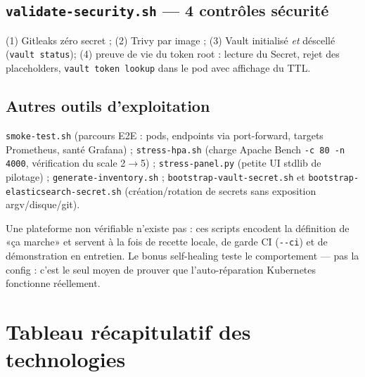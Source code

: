 \documentclass[11pt,a4paper]{article}
\begin{document}
\subsection{\texttt{validate-security.sh} --- 4 contrôles sécurité}
(1) Gitleaks zéro secret ; (2) Trivy par image ; (3) Vault initialisé \emph{et} déscellé (\texttt{vault status}); (4) preuve de vie du token root : lecture du Secret, rejet des placeholders, \texttt{vault token lookup} dans le pod avec affichage du TTL.

\subsection{Autres outils d'exploitation}
\texttt{smoke-test.sh} (parcours E2E : pods, endpoints via port-forward, targets Prometheus, santé Grafana) ; \texttt{stress-hpa.sh} (charge Apache Bench \texttt{-c 80 -n 4000}, vérification du scale 2$\rightarrow$5) ; \texttt{stress-panel.py} (petite UI stdlib de pilotage) ; \texttt{generate-inventory.sh} ; \texttt{bootstrap-vault-secret.sh} et \texttt{bootstrap-elasticsearch-secret.sh} (création/rotation de secrets sans exposition argv/disque/git).

\begin{whybox}
Une plateforme non vérifiable n'existe pas : ces scripts encodent la définition de «ça marche» et servent à la fois de recette locale, de garde CI (\texttt{-{}-ci}) et de démonstration en entretien. Le bonus self-healing teste le comportement --- pas la config : c'est le seul moyen de prouver que l'auto-réparation Kubernetes fonctionne réellement.
\end{whybox}

\clearpage

\section{Tableau récapitulatif des technologies}
\end{document}
